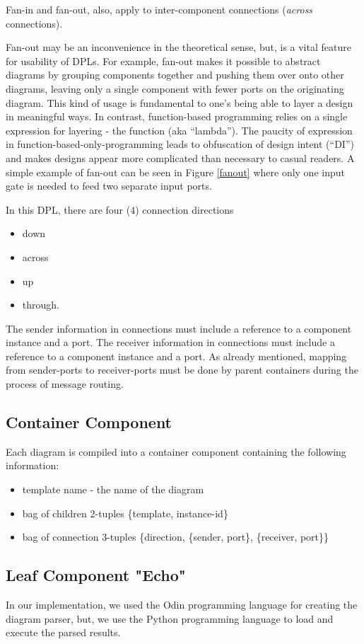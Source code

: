 \documentclass[10pt,anonymous,review]{acmart}
\begin{document}
Fan-in and fan-out, also, apply to inter-component connections (\emph{across} connections).

Fan-out may be an inconvenience in the theoretical sense, but, is a vital feature for usability of DPLs. For example, fan-out makes it possible to abstract diagrams by grouping components together and pushing them over onto other diagrams, leaving only a single component with fewer ports on the originating diagram. This kind of usage is fundamental to one’s being able to layer a design in meaningful ways. In contrast, function-based programming relies on a single expression for layering - the function (aka “lambda”). The paucity of expression in function-based-only-programming leads to obfuscation of design intent (“DI”) and makes designs appear more complicated than necessary to casual readers. A simple example of fan-out can be seen in Figure \ref{fanout} where only one input gate is needed to feed two separate input ports.




In this DPL, there are four (4) connection directions
\begin{itemize}
\setlength\itemsep{-0.3em}
\item down
\item across
\item up
\item through.
\end{itemize}
The sender information in connections must include a reference to a component instance and a port.
The receiver information in connections must include a reference to a component instance and a port.
As already mentioned, mapping from sender-ports to receiver-ports must be done by parent containers during the process of message routing.
\subsection{Container Component}
Each diagram is compiled into a container component containing the following information:
\begin{itemize}
\setlength\itemsep{-0.3em}
\item template name - the name of the diagram
\item bag of children 2-tuples \{template, instance-id\}
\item bag of connection 3-tuples \{direction, \{sender, port\}, \{receiver, port\}\}
\end{itemize}

\subsection{Leaf Component "Echo"}
In our implementation, we used the Odin programming language for
creating the diagram parser, but, we use the Python programming
language to load and execute the parsed results.
\end{document}
